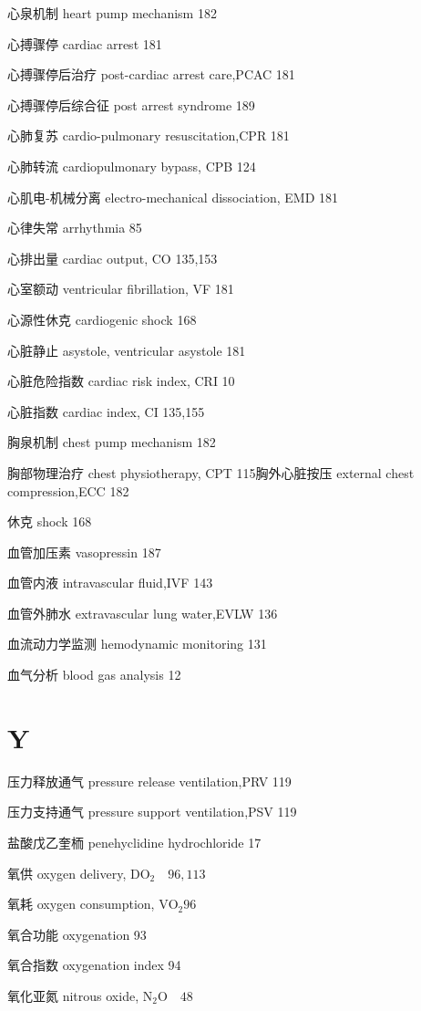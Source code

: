 \documentclass[10pt]{article}
\begin{document}
心泉机制 heart pump mechanism 182

心搏骤停 cardiac arrest 181

心搏骤停后治疗 post-cardiac arrest care,PCAC 181

心搏骤停后综合征 post arrest syndrome 189

心肺复苏 cardio-pulmonary resuscitation,CPR 181

心肺转流 cardiopulmonary bypass, CPB 124

心肌电-机械分离 electro-mechanical dissociation, EMD 181

心律失常 arrhythmia 85

心排出量 cardiac output, CO 135,153

心室额动 ventricular fibrillation, VF 181

心源性休克 cardiogenic shock 168

心脏静止 asystole, ventricular asystole 181

心脏危险指数 cardiac risk index, CRI 10

心脏指数 cardiac index, CI 135,155

胸泉机制 chest pump mechanism 182

胸部物理治疗 chest physiotherapy, CPT 115胸外心脏按压 external chest compression,ECC 182

休克 shock 168

血管加压素 vasopressin 187

血管内液 intravascular fluid,IVF 143

血管外肺水 extravascular lung water,EVLW 136

血流动力学监测 hemodynamic monitoring 131

血气分析 blood gas analysis 12

\section*{Y}
压力释放通气 pressure release ventilation,PRV 119

压力支持通气 pressure support ventilation,PSV 119

盐酸戊乙奎栭 penehyclidine hydrochloride 17

氧供 oxygen delivery, $\mathrm{DO}_{2} \quad 96,113$

氧耗 oxygen consumption, $\mathrm{VO}_{2} 96$

氧合功能 oxygenation 93

氧合指数 oxygenation index 94

氧化亚氮 nitrous oxide, $\mathrm{N}_{2} \mathrm{O} \quad 48$
\end{document}

